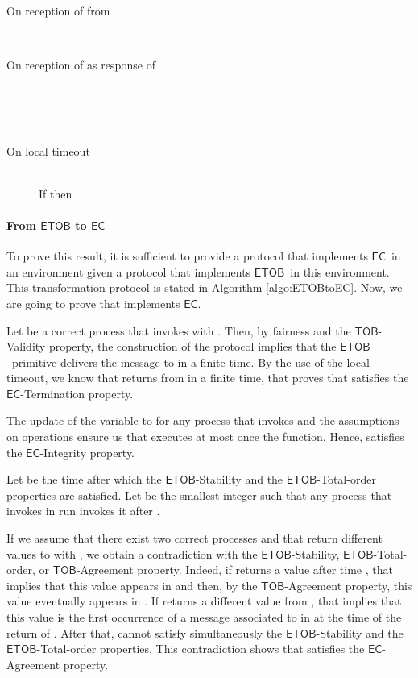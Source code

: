\documentclass[11pt]{article}
\newcommand{\EC}{\ensuremath{\mathsf{EC}}}
\newcommand{\ETOB}{\ensuremath{\mathsf{ETOB}}}
\newcommand{\TOB}{\ensuremath{\mathsf{TOB}}}
\begin{document}
{\begin{algorithm}
\begin{description}
\item[On reception of  from ]~\\


\item[On reception of  as response of ]~\\
\\
\\


\item[On local timeout]~\\
If  then\\


\end{description}
\normalsize
\end{algorithm}



\paragraph{From {\ETOB} to {\EC}}
To prove this result, it is sufficient to provide a protocol that
implements \EC~in an environment  given a protocol that
implements \ETOB~in this environment. This transformation protocol
 is stated  in Algorithm
\ref{algo:ETOBtoEC}. Now, we are going to prove that  implements \EC.

Let  be a correct process that invokes  with . Then, by fairness and the \TOB-Validity property, the construction of the protocol implies that the \ETOB~primitive delivers the message  to  in a finite time. By the use of the local timeout, we know that  returns from  in a finite time, that proves that  satisfies the \EC-Termination property.

The update of the variable  to  for any process  that invokes  and the assumptions on operations  ensure us that  executes at most once the function\linebreak . Hence,  satisfies the \EC-Integrity property.

Let  be the time after which the \ETOB-Stability and the \ETOB-Total-order properties are satisfied. Let  be the smallest integer such that any process that invokes  in run  invokes it after .

If we assume that there exist two correct processes  and  that return different values to  with , we obtain a contradiction with the \ETOB-Stability, \ETOB-Total-order, or \TOB-Agreement property. Indeed, if  returns a value after time , that implies that this value appears in  and then, by the \TOB-Agreement property, this value eventually appears in . If  returns a different value from , that implies that this value is the first occurrence of a message associated to  in  at the time of the return of . After that,  cannot satisfy simultaneously the \ETOB-Stability and the \ETOB-Total-order properties. This contradiction shows that  satisfies the \EC-Agreement property.

}
\end{document}
